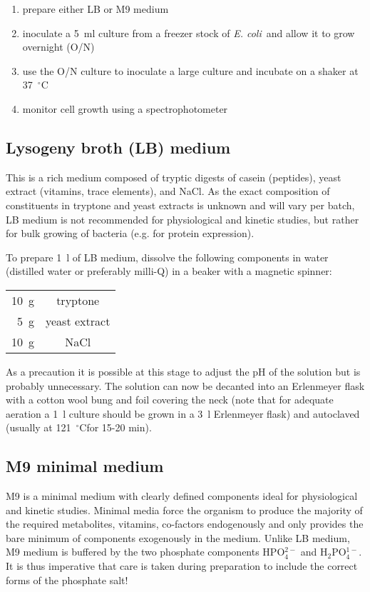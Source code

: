 \documentclass[a4paper]{article}
\newcommand{\dc}{~$^{\circ}$C}
\newcommand{\ec}{\textit{E. coli}}
\begin{document}
\begin{multicols}{2}
\begin{enumerate}
\item prepare either LB or M9 medium
\item inoculate a 5~ml culture from a freezer stock of \ec\ and allow it to grow overnight (O/N)
\item use the O/N culture to inoculate a large culture and incubate on a shaker at 37\dc
\item monitor cell growth using a spectrophotometer
\end{enumerate}

\subsection{Lysogeny broth (LB) medium} 

This is a rich medium composed of tryptic digests of casein (peptides), yeast
extract (vitamins, trace elements), and NaCl. As the exact composition of
constituents in tryptone and yeast extracts is unknown and will vary per batch,
LB medium is not recommended for physiological and kinetic studies, but rather
for bulk growing of bacteria (e.g. for protein expression).

To prepare 1~l of LB medium, dissolve the following components in water
(distilled water or preferably milli-Q) in a beaker with a magnetic spinner:

\begin{center}
\begin{tabular}[h]{rc} \toprule
10~g    &tryptone \\ 
5~g     &yeast extract\\ 
10~g    &NaCl\\ \bottomrule
\end{tabular}
\end{center}

As a precaution it is possible at this stage to adjust the pH of the solution
but is probably unnecessary. The solution can now be decanted into an
Erlenmeyer flask with a cotton wool bung and foil covering the neck (note that
for adequate aeration a 1~l culture should be grown in a 3~l Erlenmeyer flask)
and autoclaved (usually at 121\dc for 15-20 min).

\subsection{M9 minimal medium}

M9 is a minimal medium with clearly defined components ideal for physiological
and kinetic studies. Minimal media force the organism to produce the majority
of the required metabolites, vitamins, co-factors endogenously and only
provides the bare minimum of components exogenously in the medium. Unlike LB
medium, M9 medium is buffered by the two phosphate components HPO$_4^{2-}$ and
H$_2$PO$_4^{1-}$. It is thus imperative that care is taken during preparation to
include the correct forms of the phosphate salt!


\end{multicols}
\end{document}
